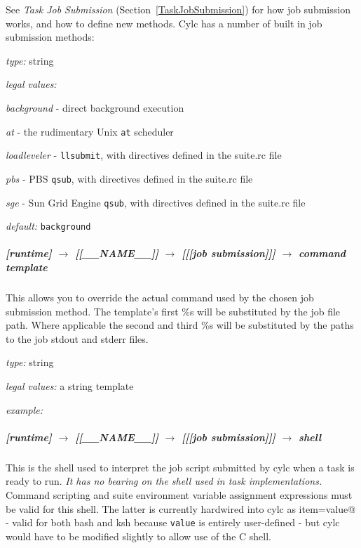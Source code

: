 See {\em Task Job Submission} (Section~\ref{TaskJobSubmission}) 
for how job submission works, and how to define new methods.
Cylc has a number of built in job submission methods:
\begin{myitemize}
\item {\em type:} string
\item {\em legal values:} 
   \begin{myitemize}
       \item {\em background} - direct background execution
       \item {\em at} - the rudimentary Unix \lstinline=at= scheduler
       \item {\em loadleveler} - \lstinline=llsubmit=, with directives defined in the suite.rc file 
       \item {\em pbs} - PBS \lstinline=qsub=, with directives defined in the suite.rc file 
       \item {\em sge} - Sun Grid Engine \lstinline=qsub=, with directives defined in the suite.rc file 
   \end{myitemize}
\item {\em default:} \lstinline=background=
\end{myitemize}

\subparagraph[command template]{[runtime] $\rightarrow$ [[\_\_NAME\_\_]] $\rightarrow$ [[[job submission]]] $\rightarrow$ command template}

This allows you to override the actual command used by the chosen job
submission method. The template's first \%s will be substituted by the
job file path.  Where applicable the second and third \%s will be
substituted by the paths to the job stdout and stderr files.

\begin{myitemize}
\item {\em type:} string
\item {\em legal values:} a string template
\item {\em example:} \lstinline@llsubmit %s@
\end{myitemize}

\subparagraph[shell]{[runtime] $\rightarrow$ [[\_\_NAME\_\_]] $\rightarrow$ [[[job submission]]] $\rightarrow$ shell}
\label{JobSubShell}

This is the shell used to interpret the job script submitted by cylc
when a task is ready to run.  {\em It has no bearing on the shell used
in task implementations.} Command scripting and suite environment 
variable assignment expressions must be valid for this shell. The 
latter is currently hardwired into cylc as 
\lstinline@export item=value@ - valid for both bash and ksh
because \lstinline=value= is entirely user-defined - but cylc would have
to be modified slightly to allow use of the C shell.

